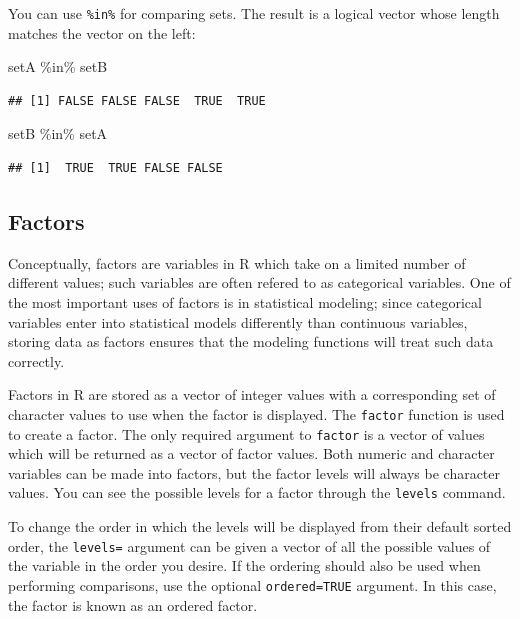 \documentclass[
]{book}
\newenvironment{Shaded}{\begin{snugshade}}{\end{snugshade}}
\newcommand{\NormalTok}[1]{#1}
\newcommand{\SpecialCharTok}[1]{\textcolor[rgb]{0.00,0.00,0.00}{#1}}
\begin{document}
You can use \texttt{\%in\%} for comparing sets. The result is a logical vector whose length matches the vector on the left:

\begin{Shaded}
\begin{Highlighting}[]
\NormalTok{setA }\SpecialCharTok{\%in\%}\NormalTok{ setB}
\end{Highlighting}
\end{Shaded}

\begin{verbatim}
## [1] FALSE FALSE FALSE  TRUE  TRUE
\end{verbatim}

\begin{Shaded}
\begin{Highlighting}[]
\NormalTok{setB }\SpecialCharTok{\%in\%}\NormalTok{ setA}
\end{Highlighting}
\end{Shaded}

\begin{verbatim}
## [1]  TRUE  TRUE FALSE FALSE
\end{verbatim}

\hypertarget{factors}{%
\subsection{Factors}\label{factors}}

Conceptually, factors are variables in R which take on a limited number of different values; such variables are often refered to as categorical variables. One of the most important uses of factors is in statistical modeling; since categorical variables enter into statistical models differently than continuous variables, storing data as factors ensures that the modeling functions will treat such data correctly.

Factors in R are stored as a vector of integer values with a corresponding set of character values to use when the factor is displayed. The \texttt{factor} function is used to create a factor. The only required argument to \texttt{factor} is a vector of values which will be returned as a vector of factor values. Both numeric and character variables can be made into factors, but the factor levels will always be character values. You can see the possible levels for a factor through the \texttt{levels} command.

To change the order in which the levels will be displayed from their default sorted order, the \texttt{levels=} argument can be given a vector of all the possible values of the variable in the order you desire. If the ordering should also be used when performing comparisons, use the optional \texttt{ordered=TRUE} argument. In this case, the factor is known as an ordered factor.
\end{document}

